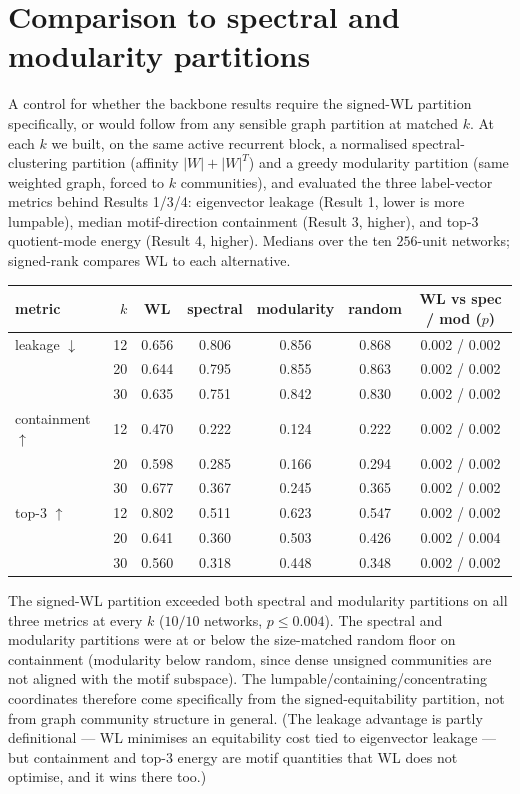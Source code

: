 \documentclass[11pt]{article}
\begin{document}
\section{Comparison to spectral and modularity partitions}
\label{sec:partfamily}
A control for whether the backbone results require the signed-WL partition specifically, or would
follow from any sensible graph partition at matched $k$. At each $k$ we built, on the same active
recurrent block, a normalised spectral-clustering partition (affinity $|W|+|W|^{T}$) and a greedy
modularity partition (same weighted graph, forced to $k$ communities), and evaluated the three
label-vector metrics behind Results 1/3/4: eigenvector leakage (Result 1, lower is more lumpable),
median motif-direction containment (Result 3, higher), and top-3 quotient-mode energy (Result 4,
higher). Medians over the ten $256$-unit networks; signed-rank compares WL to each alternative.
\begin{center}\small
\begin{tabular}{lrccccc}
\toprule
metric & $k$ & WL & spectral & modularity & random & WL vs spec / mod ($p$) \\
\midrule
leakage $\downarrow$     & 12 & 0.656 & 0.806 & 0.856 & 0.868 & 0.002 / 0.002 \\
                         & 20 & 0.644 & 0.795 & 0.855 & 0.863 & 0.002 / 0.002 \\
                         & 30 & 0.635 & 0.751 & 0.842 & 0.830 & 0.002 / 0.002 \\
containment $\uparrow$   & 12 & 0.470 & 0.222 & 0.124 & 0.222 & 0.002 / 0.002 \\
                         & 20 & 0.598 & 0.285 & 0.166 & 0.294 & 0.002 / 0.002 \\
                         & 30 & 0.677 & 0.367 & 0.245 & 0.365 & 0.002 / 0.002 \\
top-3 $\uparrow$         & 12 & 0.802 & 0.511 & 0.623 & 0.547 & 0.002 / 0.002 \\
                         & 20 & 0.641 & 0.360 & 0.503 & 0.426 & 0.002 / 0.004 \\
                         & 30 & 0.560 & 0.318 & 0.448 & 0.348 & 0.002 / 0.002 \\
\bottomrule
\end{tabular}
\end{center}
The signed-WL partition exceeded both spectral and modularity partitions on all three metrics at
every $k$ ($10/10$ networks, $p\leq0.004$). The spectral and modularity partitions were at or
below the size-matched random floor on containment (modularity below random, since dense unsigned
communities are not aligned with the motif subspace). The lumpable/containing/concentrating
coordinates therefore come specifically from the signed-equitability partition, not from graph
community structure in general. (The leakage advantage is partly definitional --- WL minimises an
equitability cost tied to eigenvector leakage --- but containment and top-3 energy are motif
quantities that WL does not optimise, and it wins there too.)
\end{document}
